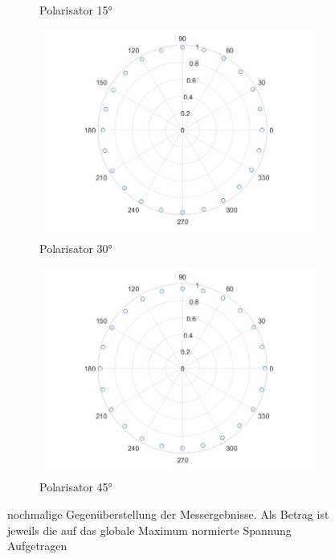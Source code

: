 \documentclass[a4paper, 12pt,]{scrartcl}
\begin{document}
\begin{figure}[H]
\begin{adjustwidth}{-1em}{7em}
\begin{subfigure}[b]{0.5\textwidth}
    \caption{Polarisator 15°}
    \label{fig:}
  \end{subfigure}
\end{adjustwidth}\centering
\begin{adjustwidth}{-1em}{7em}
  \begin{subfigure}[b]{0.5\textwidth}
    \includegraphics[width=\textwidth]{M3}
    \caption{Polarisator 30°}
    \label{fig:}
  \end{subfigure}
  \begin{subfigure}[b]{0.5\textwidth}
    \includegraphics[width=\textwidth]{M4}
    \caption{Polarisator 45°}
    \label{fig:}
  \end{subfigure}
\end{adjustwidth}
\caption{nochmalige Gegenüberstellung der Messergebnisse. Als Betrag ist jeweils die auf das globale Maximum normierte Spannung Aufgetragen}
\end{figure}
\end{document}
